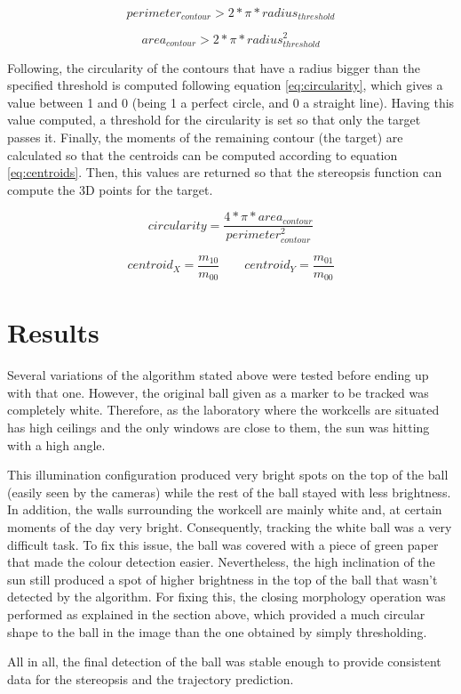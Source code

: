 \begin{equation}
perimeter_{contour}>2*\pi*radius_{threshold}
\label{eq:circ_perimeter}
\end{equation}

\begin{equation}
area_{contour}>2*\pi*radius_{threshold}^{2}
\label{eq:circ_area}
\end{equation}

Following, the circularity of the contours that have a radius bigger than the specified threshold is computed following equation \ref{eq:circularity}, which gives a value between 1 and 0 (being 1 a perfect circle, and 0 a straight line). Having this value computed, a threshold for the circularity is set so that only the target passes it. Finally, the moments of the remaining contour (the target) are calculated so that the centroids can be computed according to equation \ref{eq:centroids}. Then, this values are returned so that the stereopsis function can compute the 3D points for the target.

\begin{equation}
circularity=\frac{4*\pi*area_{contour}}{perimeter_{contour}^{2}}
\label{eq:circularity}
\end{equation}

\begin{equation}
centroid_{X}=\frac{m_{10}}{m_{00}} \qquad centroid_{Y}=\frac{m_{01}}{m_{00}}
\label{eq:centroids}
\end{equation}

\section{Results}
Several variations of the algorithm stated above were tested before ending up with that one. However, the original ball given as a marker to be tracked was completely white. Therefore, as the laboratory where the workcells are situated has high ceilings and the only windows are close to them, the sun was hitting with a high angle. 

This illumination configuration produced very bright spots on the top of the ball (easily seen by the cameras) while the rest of the ball stayed with less brightness. In addition, the walls surrounding the workcell are mainly white and, at certain moments of the day very bright. Consequently, tracking the white ball was a very difficult task. To fix this issue, the ball was covered with a piece of green paper that made the colour detection easier. Nevertheless, the high inclination of the sun still produced a spot of higher brightness in the top of the ball that wasn't detected by the algorithm. For fixing this, the closing morphology operation was performed as explained in the section above, which provided a much circular shape to the ball in the image than the one obtained by simply thresholding.

All in all, the final detection of the ball was stable enough to provide consistent data for the stereopsis and the trajectory prediction.

